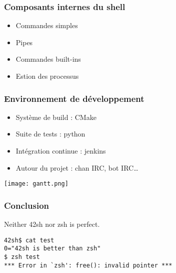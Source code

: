 \documentclass{beamer}
\begin{document}
\begin{frame}
    \frametitle{Composants internes du shell}
    \begin{itemize}
        \item Commandes simples
        \item Pipes
        \item Commandes built-ins
        \item Estion des processus
    \end{itemize}
\end{frame}

\begin{frame}
    \frametitle{Environnement de développement}
    \begin{itemize}
        \item Système de build : CMake
        \item Suite de tests : python
        \item Intégration continue : jenkins
        \item Autour du projet : chan IRC, bot IRC\dots
    \end{itemize}
\end{frame}

\begin{frame}
    \texttt{[image: gantt.png]}
\end{frame}

\begin{frame} [fragile]
    \frametitle{Conclusion}
    Neither 42sh nor zsh is perfect.
\begin{verbatim}
42sh$ cat test
0="42sh is better than zsh"
$ zsh test
*** Error in `zsh': free(): invalid pointer ***
\end{verbatim}
\end{frame}
\end{document}
